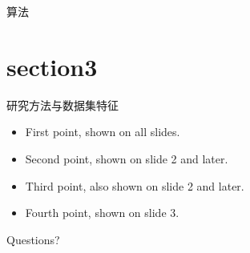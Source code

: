 \documentclass[10pt]{beamer}
\begin{document}
\begin{frame}{算法}
\end{frame}

\section{section3}
\begin{frame}{研究方法与数据集特征}
  \begin{itemize}
    \item<1-> First point, shown on all slides.
    \item<2-> Second point, shown on slide 2 and later.
    \item<3-> Third point, also shown on slide 2 and later.
    \item<4-> Fourth point, shown on slide 3.
  \end{itemize}
\end{frame}

\begin{frame}
  \hspace{3cm}
  \Huge{Questions?}
\end{frame}
\end{document}
